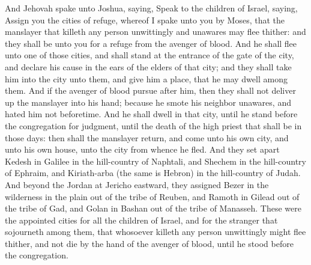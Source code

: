 And Jehovah spake unto Joshua, saying, Speak to the children of Israel, saying, Assign you the cities of refuge, whereof I spake unto you by Moses, that the manslayer that killeth any person unwittingly and unawares may flee thither: and they shall be unto you for a refuge from the avenger of blood. And he shall flee unto one of those cities, and shall stand at the entrance of the gate of the city, and declare his cause in the ears of the elders of that city; and they shall take him into the city unto them, and give him a place, that he may dwell among them. And if the avenger of blood pursue after him, then they shall not deliver up the manslayer into his hand; because he smote his neighbor unawares, and hated him not beforetime. And he shall dwell in that city, until he stand before the congregation for judgment, until the death of the high priest that shall be in those days: then shall the manslayer return, and come unto his own city, and unto his own house, unto the city from whence he fled.  And they set apart Kedesh in Galilee in the hill-country of Naphtali, and Shechem in the hill-country of Ephraim, and Kiriath-arba (the same is Hebron) in the hill-country of Judah. And beyond the Jordan at Jericho eastward, they assigned Bezer in the wilderness in the plain out of the tribe of Reuben, and Ramoth in Gilead out of the tribe of Gad, and Golan in Bashan out of the tribe of Manasseh. These were the appointed cities for all the children of Israel, and for the stranger that sojourneth among them, that whosoever killeth any person unwittingly might flee thither, and not die by the hand of the avenger of blood, until he stood before the congregation. 

